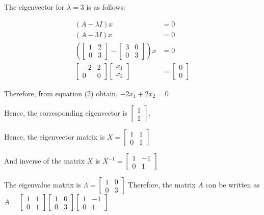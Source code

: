 \documentclass{article}
\begin{document}
The eigenvector for $\lambda=3$ is as follows:

$$
\begin{aligned}
(A-\lambda I) x & =0 \\
(A-3 I) x & =0 \\
\left(\left[\begin{array}{ll}
1 & 2 \\
0 & 3
\end{array}\right]-\left[\begin{array}{ll}
3 & 0 \\
0 & 3
\end{array}\right]\right) x & =0 \\
{\left[\begin{array}{cc}
-2 & 2 \\
0 & 0
\end{array}\right]\left[\begin{array}{l}
x_{1} \\
x_{2}
\end{array}\right] } & =\left[\begin{array}{l}
0 \\
0
\end{array}\right]
\end{aligned}
$$

Therefore, from equation (2) obtain, $-2 x_{1}+2 x_{2}=0$

Hence, the corresponding eigenvector is $\left[\begin{array}{l}1 \\ 1\end{array}\right]$.

Hence, the eigenvector matrix is $X=\left[\begin{array}{ll}1 & 1 \\ 0 & 1\end{array}\right]$

And inverse of the matrix $X$ is $X^{-1}=\left[\begin{array}{cc}1 & -1 \\ 0 & 1\end{array}\right]$

The eigenvalue matrix is $\Lambda=\left[\begin{array}{ll}1 & 0 \\ 0 & 3\end{array}\right]$
Therefore, the matrix $A$ can be written as $A=\left[\begin{array}{ll}1 & 1 \\ 0 & 1\end{array}\right]\left[\begin{array}{ll}1 & 0 \\ 0 & 3\end{array}\right]\left[\begin{array}{cc}1 & -1 \\ 0 & 1\end{array}\right]$
\end{document}
